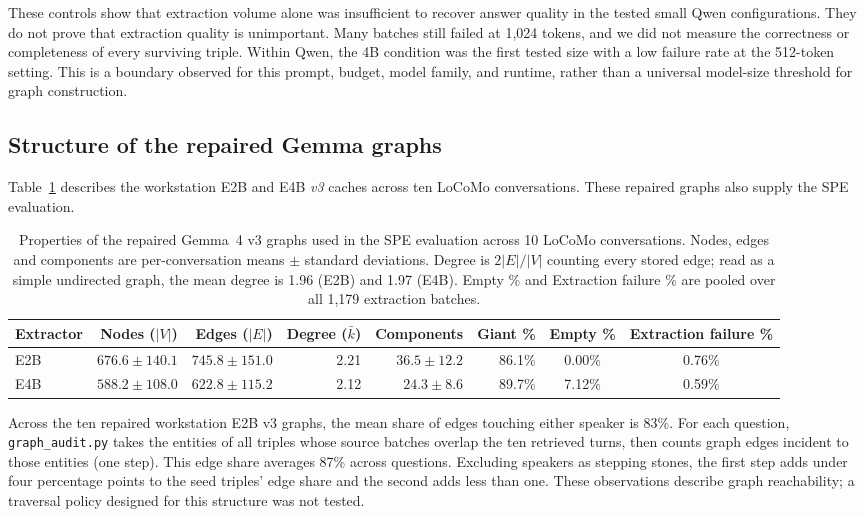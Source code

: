 These controls show that extraction volume alone was insufficient to recover answer
quality in the tested small Qwen configurations. They do not prove that extraction quality
is unimportant. Many batches still failed at 1,024 tokens, and we did not measure the
correctness or completeness of every surviving triple. Within Qwen, the 4B condition was
the first tested size with a low failure rate at the 512-token setting. This is a boundary
observed for this prompt, budget, model family, and runtime, rather than a universal model-size
threshold for graph construction.

\subsection{Structure of the repaired Gemma graphs}
\label{sec:graph_topology}

Table~\ref{tab:graph_topology} describes the workstation E2B and E4B \emph{v3} caches
across ten LoCoMo conversations. These repaired graphs also supply the SPE evaluation.

\begin{table}[htbp]
  \centering
  \scriptsize
  \setlength{\tabcolsep}{3pt}
  \begin{tabular}{lrrrrrcc}
    \toprule
    Extractor & Nodes ($|V|$) & Edges ($|E|$) & Degree ($\bar{k}$) & Components & Giant \% & Empty \% & Extraction failure \% \\
    \midrule
    E2B & $676.6 \pm 140.1$ & $745.8 \pm 151.0$ & 2.21 & $36.5 \pm 12.2$ & 86.1\% & 0.00\% & 0.76\% \\
    E4B & $588.2 \pm 108.0$ & $622.8 \pm 115.2$ & 2.12 & $24.3 \pm 8.6$  & 89.7\% & 7.12\% & 0.59\% \\
    \bottomrule
  \end{tabular}
  \caption{Properties of the repaired Gemma~4 v3 graphs used in the SPE evaluation across 10 LoCoMo
           conversations. Nodes, edges and components are per-conversation means $\pm$ standard
           deviations. Degree is $2|E|/|V|$ counting every stored edge; read as a simple undirected
           graph, the mean degree is 1.96 (E2B) and 1.97 (E4B). Empty \% and Extraction failure \% are
           pooled over all 1,179 extraction batches.}
  \label{tab:graph_topology}
\end{table}

Across the ten repaired workstation E2B v3 graphs, the mean share of edges touching
either speaker is 83\%.
For each question, \texttt{graph\_audit.py} takes the entities of all triples whose source
batches overlap the ten retrieved turns, then counts graph edges incident to those entities
(one step). This edge share averages 87\% across questions. Excluding speakers as stepping
stones, the first step adds under four percentage points to the seed triples' edge share
and the second adds less than one. These observations describe graph reachability;
a traversal policy designed for this structure was not tested.

